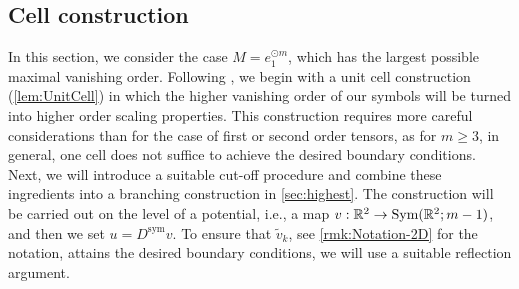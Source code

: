 \documentclass[a4paper, 10pt, twoside, notitlepage]{amsart}
\theoremstyle{plain}
\newcommand{\R}{\mathbb{R}}
\newcommand{\Ds}{D^{\text{sym}}}
\begin{document}
		
		\subsection{Cell construction}
		\label{sec:cell}
		
	          	In this section, we consider the case $M = e_1^{\odot m}$, which has the largest possible maximal vanishing order.  Following \cite{CC15}, we begin with a unit cell construction (\cref{lem:UnitCell}) in which the higher vanishing order
		of our symbols will be turned into higher order scaling properties.
                This construction requires more careful considerations than for the case of first or second order tensors, as for $m \geq 3$, in general, one cell does not suffice to achieve the desired boundary conditions.
                Next, we will introduce a suitable cut-off procedure and combine these ingredients into a branching construction in
		\cref{sec:highest}.
		The construction will be carried out on the level of a potential, i.e., a map $v: \R^2 \to \textup{Sym}(\R^2;m-1)$, and then we set $u = \Ds v$. To ensure that $\tilde{v}_k$, see \cref{rmk:Notation-2D} for the notation, attains  the desired boundary conditions, we will use a suitable reflection argument.
		
		
		
\end{document}
